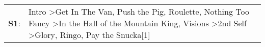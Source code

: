 \begin{supertabular}{p{0.03\textwidth}p{0.92\textwidth}}
 \textbf{S1}:  &  Intro\textsuperscript{} \textgreater \enspace Get In The Van\textsuperscript{}, \enspace Push the Pig\textsuperscript{}, \enspace Roulette\textsuperscript{}, \enspace Nothing Too Fancy\textsuperscript{} \textgreater \enspace In the Hall of the Mountain King\textsuperscript{}, \enspace Visions\textsuperscript{} \textgreater \enspace 2nd Self\textsuperscript{} \textgreater \enspace Glory\textsuperscript{}, \enspace Ringo\textsuperscript{}, \enspace Pay the Snucka[1]\textsuperscript{}  \enspace  \\
\end{supertabular}
